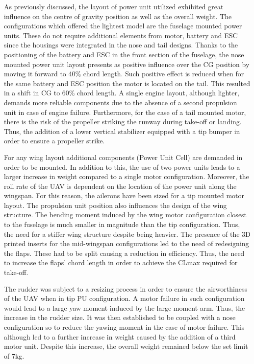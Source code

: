 \documentclass[../../main.tex]{subfiles}
\begin{document}
As previously discussed, the layout of power unit utilized exhibited great influence on the centre of gravity position as well as the overall weight.
The configurations which offered the lightest model are the fuselage mounted power units.
These do not require additional elements from motor, battery and ESC since the housings were integrated in the nose and tail designs.
Thanks to the positioning of the battery and ESC in the front section of the fuselage, the nose mounted power unit layout presents as positive influence over the CG position by moving it forward to 40\% chord length.
Such positive effect is reduced when for the same battery and ESC position the motor is located on the tail.
This resulted in a shift in CG to 60\% chord length.
A single engine layout, although lighter, demands more reliable components due to the absence of a second propulsion unit in case of engine failure.
Furthermore, for the case of a tail mounted motor, there is the risk of the propeller striking the runway during take-off or landing.
Thus, the addition of a lower vertical stabilizer equipped with a tip bumper in order to ensure a propeller strike. 

For any wing layout additional components (Power Unit Cell) are demanded in order to be mounted.
In addition to this, the use of two power units leads to a larger increase in weight compared to a single motor configuration.
Moreover, the roll rate of the UAV is dependent on the location of the power unit along the wingspan.
For this reason, the ailerons have been sized for a tip mounted motor layout.
The propulsion unit position also influences the design of the wing structure.
The bending moment induced by the wing motor configuration closest to the fuselage is much smaller in magnitude than the tip configuration.
Thus, the need for a stiffer wing structure despite being heavier.
The presence of the 3D printed inserts for the mid-wingspan configurations led to the need of redesigning the flaps.
These had to be split causing a reduction in efficiency.
Thus, the need to increase the flaps’ chord length in order to achieve the CLmax required for take-off. 

The rudder was subject to a resizing process in order to ensure the airworthiness of the UAV when in tip PU configuration.
A motor failure in such configuration would lead to a large yaw moment induced by the large moment arm.
Thus, the increase in the rudder size.
It was then established to be coupled with a nose configuration so to reduce the yawing moment in the case of motor failure.
This although led to a further increase in weight caused by the addition of a third motor unit.
Despite this increase, the overall weight remained below the set limit of 7kg. 
\end{document}
